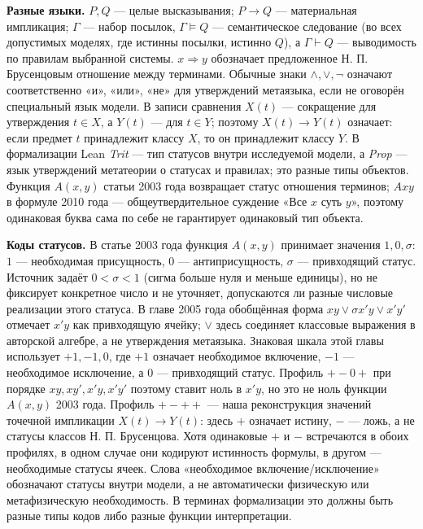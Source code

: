 \documentclass[12pt,a4paper]{article}
\begin{document}
\textbf{Разные языки.} \(P,Q\) — целые высказывания; \(P\to Q\) — материальная импликация; \(\Gamma\) — набор посылок, \(\Gamma\models Q\) — семантическое следование (во всех допустимых моделях, где истинны посылки, истинно \(Q\)), а \(\Gamma\vdash Q\) — выводимость по правилам выбранной системы. \(x\Rightarrow y\) обозначает предложенное Н. П. Брусенцовым отношение между терминами. Обычные знаки \(\land,\lor,\neg\) означают соответственно «и», «или», «не» для утверждений метаязыка, если не оговорён специальный язык модели. В записи сравнения \(X(t)\) — сокращение для утверждения \(t\in X\), а \(Y(t)\) — для \(t\in Y\); поэтому \(X(t)\to Y(t)\) означает: если предмет \(t\) принадлежит классу \(X\), то он принадлежит классу \(Y\). В формализации Lean \emph{Trit} — тип статусов внутри исследуемой модели, а \emph{Prop} — язык утверждений метатеории о статусах и правилах; это разные типы объектов. Функция \(A(x,y)\) статьи 2003 года возвращает статус отношения терминов; \(Axy\) в формуле 2010 года — общеутвердительное суждение «Все \(x\) суть \(y\)», поэтому одинаковая буква сама по себе не гарантирует одинаковый тип объекта.

\textbf{Коды статусов.} В статье 2003 года функция \(A(x,y)\) принимает значения \(1,0,\sigma\): \(1\) — необходимая присущность, \(0\) — антиприсущность, \(\sigma\) — привходящий статус. Источник задаёт \(0<\sigma<1\) (сигма больше нуля и меньше единицы), но не фиксирует конкретное число и не уточняет, допускаются ли разные числовые реализации этого статуса. В главе 2005 года обобщённая форма \(xy\lor\sigma x'y\lor x'y'\) отмечает \(x'y\) как привходящую ячейку; \(\lor\) здесь соединяет классовые выражения в авторской алгебре, а не утверждения метаязыка. Знаковая шкала этой главы использует \(+1,-1,0\), где \(+1\) означает необходимое включение, \(-1\) — необходимое исключение, а \(0\) — привходящий статус. Профиль \(+-0+\) при порядке \(xy,xy',x'y,x'y'\) поэтому ставит ноль в \(x'y\), но это не ноль функции \(A(x,y)\) 2003 года. Профиль \(+-++\) — наша реконструкция значений точечной импликации \(X(t)\to Y(t)\): здесь \(+\) означает истину, \(-\) — ложь, а не статусы классов Н. П. Брусенцова. Хотя одинаковые \(+\) и \(-\) встречаются в обоих профилях, в одном случае они кодируют истинность формулы, в другом — необходимые статусы ячеек. Слова «необходимое включение/исключение» обозначают статусы внутри модели, а не автоматически физическую или метафизическую необходимость. В терминах формализации это должны быть разные типы кодов либо разные функции интерпретации.
\end{document}
